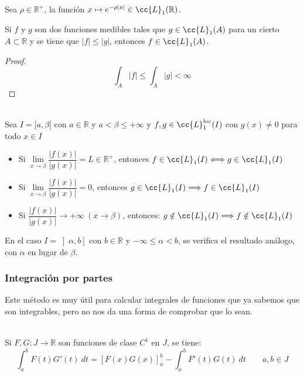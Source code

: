 \begin{ejercicio*}
    Sea $\rho \in \mathbb{R}^+$, la función $x\mapsto e^{-\rho|x|}\in \cc{L}_1(\mathbb{R})$.
\end{ejercicio*}

\begin{observacion}
    Si $f$ y $g$ son dos funciones medibles tales que $g\in \cc{L}_1(A)$ para un cierto $A\subset \mathbb{R}$ y se tiene que $|f|\leq |g|$, entonces $f\in \cc{L}_1(A)$.
    
\end{observacion}
\begin{proof}
    \begin{equation*}
        \int_A |f| \leq \int_A |g| < \infty
    \end{equation*}
\end{proof}


\begin{prop}\ \\
    Sea $I=[a, \beta[$ con $a\in \mathbb{R}$ y $a<\beta \leq +\infty$ y $f,g\in \cc{L}_1^{\text{loc}}(I)$ con $g(x)\neq 0$ para todo $x\in I$
    \begin{itemize}
        \item Si $\lim\limits_{x\to\beta}\dfrac{|f(x)|}{|g(x)|} = L \in \mathbb{R}^+ $, entonces $f\in \cc{L}_1(I) \Longleftrightarrow g\in \cc{L}_1(I)$
        \item Si $\lim\limits_{x\to\beta} \dfrac{|f(x)|}{|g(x)|} = 0 $, entonces $g\in \cc{L}_1(I)\Longrightarrow f\in \cc{L}_1(I)$
        \item Si $\dfrac{|f(x)|}{|g(x)|}\rightarrow +\infty \ (x\rightarrow\beta)$, entonces: $g\notin \cc{L}_1(I) \Longrightarrow f\notin\cc{L}_1(I)$
    \end{itemize}
    En el caso $I=\left]\alpha,b\right]$ con $b\in \mathbb{R}$ y $-\infty\leq \alpha < b$, se verifica el resultado análogo, con $\alpha$ en lugar de $\beta$.
\end{prop}

\subsubsection{Integración por partes}
Este método es muy útil para calcular integrales de funciones que ya sabemos que son integrables, pero no nos da una forma de comprobar que lo sean.
\begin{teo}\ \\
    Si $F,G:J\rightarrow\mathbb{R}$ son funciones de clase $C^1$ en $J$, se tiene:
    \begin{equation*}
        \displaystyle\int_{a}^{b} F(t)G'(t)~dt  = {[F(x)G(x)]}_a^b - \displaystyle\int_{a}^{b} F'(t)G(t)~dt  \qquad a,b\in J
    \end{equation*}
\end{teo}

